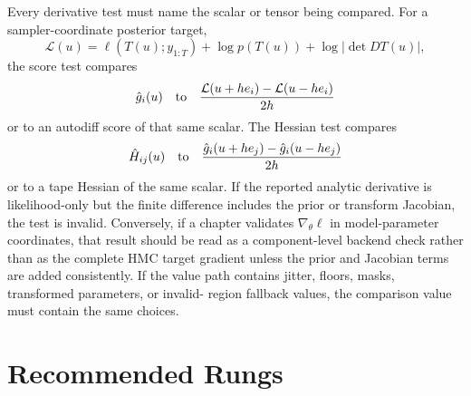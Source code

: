 Every derivative test must name the scalar or tensor being compared.  For a
sampler-coordinate posterior target,
\[
  \mathcal{L}(u)
  =
  \ell(T(u);y_{1:T})
  + \log p(T(u))
  + \log\left|\det DT(u)\right|,
\]
the score test compares
\[
  \hat g_i(u)
  \quad\hbox{to}\quad
  \frac{\mathcal{L}(u+h e_i)-\mathcal{L}(u-h e_i)}{2h}
\]
or to an autodiff score of that same scalar.  The Hessian test compares
\[
  \hat H_{ij}(u)
  \quad\hbox{to}\quad
  \frac{\hat g_i(u+h e_j)-\hat g_i(u-h e_j)}{2h}
\]
or to a tape Hessian of the same scalar.  If the reported analytic derivative is
likelihood-only but the finite difference includes the prior or transform
Jacobian, the test is invalid.  Conversely, if a chapter validates
\(\nabla_\theta\ell\) in model-parameter coordinates, that result should be read
as a component-level backend check rather than as the complete HMC target
gradient unless the prior and Jacobian terms are added consistently.  If the
value path contains jitter, floors, masks, transformed parameters, or invalid-
region fallback values, the comparison value must contain the same choices.

\section{Recommended Rungs}
\label{sec:bf-validation-recommended-rungs}


